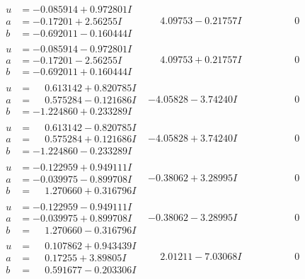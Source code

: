 \documentclass[1p]{elsarticle_modified}
\theoremstyle{definition}
\begin{document}
$$\begin{array}{c|c|c}
\begin{aligned}
u &= -0.085914 + 0.972801 I \\
a &= -0.17201 + 2.56255 I \\
b &= -0.692011 - 0.160444 I\end{aligned}
 & \phantom{-}4.09753 - 0.21757 I & \phantom{-0.000000 } 0 \\ \hline\begin{aligned}
u &= -0.085914 - 0.972801 I \\
a &= -0.17201 - 2.56255 I \\
b &= -0.692011 + 0.160444 I\end{aligned}
 & \phantom{-}4.09753 + 0.21757 I & \phantom{-0.000000 } 0 \\ \hline\begin{aligned}
u &= \phantom{-}0.613142 + 0.820785 I \\
a &= \phantom{-}0.575284 - 0.121686 I \\
b &= -1.224860 + 0.233289 I\end{aligned}
 & -4.05828 - 3.74240 I & \phantom{-0.000000 } 0 \\ \hline\begin{aligned}
u &= \phantom{-}0.613142 - 0.820785 I \\
a &= \phantom{-}0.575284 + 0.121686 I \\
b &= -1.224860 - 0.233289 I\end{aligned}
 & -4.05828 + 3.74240 I & \phantom{-0.000000 } 0 \\ \hline\begin{aligned}
u &= -0.122959 + 0.949111 I \\
a &= -0.039975 - 0.899708 I \\
b &= \phantom{-}1.270660 + 0.316796 I\end{aligned}
 & -0.38062 + 3.28995 I & \phantom{-0.000000 } 0 \\ \hline\begin{aligned}
u &= -0.122959 - 0.949111 I \\
a &= -0.039975 + 0.899708 I \\
b &= \phantom{-}1.270660 - 0.316796 I\end{aligned}
 & -0.38062 - 3.28995 I & \phantom{-0.000000 } 0 \\ \hline\begin{aligned}
u &= \phantom{-}0.107862 + 0.943439 I \\
a &= \phantom{-}0.17255 + 3.89805 I \\
b &= \phantom{-}0.591677 - 0.203306 I\end{aligned}
 & \phantom{-}2.01211 - 7.03068 I & \phantom{-0.000000 } 0 \\ \hline\begin{aligned}

\end{aligned}
\end{array}$$
\end{document}
